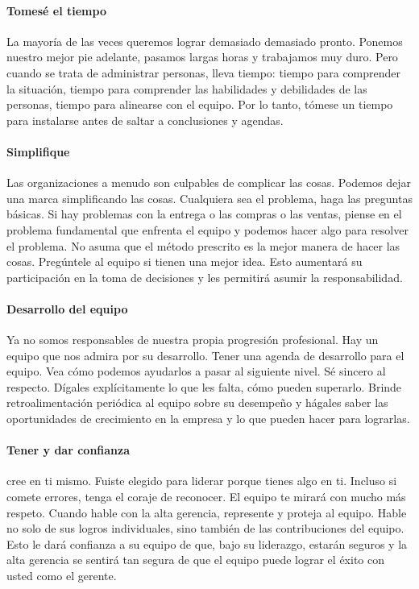 \documentclass[10pt]{book}
\begin{document}
\paragraph{Tomesé el tiempo}
La mayoría de las veces queremos lograr demasiado demasiado pronto. Ponemos nuestro mejor pie adelante, pasamos largas horas y trabajamos muy duro. Pero cuando se trata de administrar personas, lleva tiempo: tiempo para comprender la situación, tiempo para comprender las habilidades y debilidades de las personas, tiempo para alinearse con el equipo. Por lo tanto, tómese un tiempo para instalarse antes de saltar a conclusiones y agendas.
\paragraph{Simplifique}
Las organizaciones a menudo son culpables de complicar las cosas. Podemos dejar una marca simplificando las cosas. Cualquiera sea el problema, haga las preguntas básicas. Si hay problemas con la entrega o las compras o las ventas, piense en el problema fundamental que enfrenta el equipo y podemos hacer algo para resolver el problema. No asuma que el método prescrito es la mejor manera de hacer las cosas. Pregúntele al equipo si tienen una mejor idea. Esto aumentará su participación en la toma de decisiones y les permitirá asumir la responsabilidad.
\paragraph{Desarrollo del equipo}
Ya no somos responsables de nuestra propia progresión profesional. Hay un equipo que nos admira por su desarrollo. Tener una agenda de desarrollo para el equipo. Vea cómo podemos ayudarlos a pasar al siguiente nivel. Sé sincero al respecto. Dígales explícitamente lo que les falta, cómo pueden superarlo. Brinde retroalimentación periódica al equipo sobre su desempeño y hágales saber las oportunidades de crecimiento en la empresa y lo que pueden hacer para lograrlas.
\paragraph{Tener y dar confianza}
cree en ti mismo. Fuiste elegido para liderar porque tienes algo en ti. Incluso si comete errores, tenga el coraje de reconocer. El equipo te mirará con mucho más respeto. Cuando hable con la alta gerencia, represente y proteja al equipo. Hable no solo de sus logros individuales, sino también de las contribuciones del equipo. Esto le dará confianza a su equipo de que, bajo su liderazgo, estarán seguros y la alta gerencia se sentirá tan segura de que el equipo puede lograr el éxito con usted como el gerente.
\end{document}
